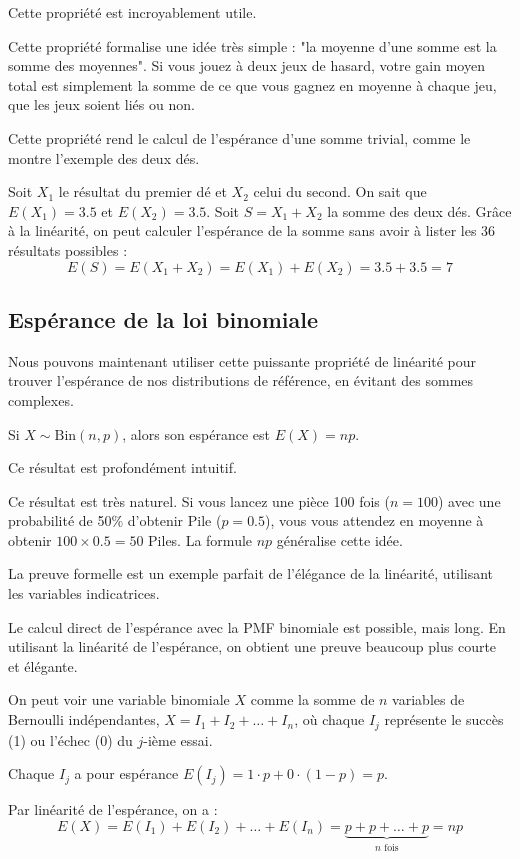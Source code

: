 Cette propriété est incroyablement utile.

\begin{intuitionbox}
Cette propriété formalise une idée très simple : "la moyenne d'une somme est la somme des moyennes". Si vous jouez à deux jeux de hasard, votre gain moyen total est simplement la somme de ce que vous gagnez en moyenne à chaque jeu, que les jeux soient liés ou non.
\end{intuitionbox}

Cette propriété rend le calcul de l'espérance d'une somme trivial, comme le montre l'exemple des deux dés.

\begin{examplebox}
Soit $X_1$ le résultat du premier dé et $X_2$ celui du second. On sait que $E(X_1) = 3.5$ et $E(X_2) = 3.5$.
Soit $S = X_1 + X_2$ la somme des deux dés. Grâce à la linéarité, on peut calculer l'espérance de la somme sans avoir à lister les 36 résultats possibles :
$$ E(S) = E(X_1 + X_2) = E(X_1) + E(X_2) = 3.5 + 3.5 = 7 $$
\end{examplebox}

\subsection{Espérance de la loi binomiale}

Nous pouvons maintenant utiliser cette puissante propriété de linéarité pour trouver l'espérance de nos distributions de référence, en évitant des sommes complexes.

\begin{theorembox}
Si $X \sim \text{Bin}(n, p)$, alors son espérance est $E(X) = np$.
\end{theorembox}

Ce résultat est profondément intuitif.

\begin{intuitionbox}
Ce résultat est très naturel. Si vous lancez une pièce 100 fois ($n=100$) avec une probabilité de 50\% d'obtenir Pile ($p=0.5$), vous vous attendez en moyenne à obtenir $100 \times 0.5 = 50$ Piles. La formule $np$ généralise cette idée.
\end{intuitionbox}

La preuve formelle est un exemple parfait de l'élégance de la linéarité, utilisant les variables indicatrices.

\begin{proofbox}
Le calcul direct de l'espérance avec la PMF binomiale est possible, mais long. En utilisant la linéarité de l'espérance, on obtient une preuve beaucoup plus courte et élégante.

On peut voir une variable binomiale $X$ comme la somme de $n$ variables de Bernoulli indépendantes, $X = I_1 + I_2 + \dots + I_n$, où chaque $I_j$ représente le succès (1) ou l'échec (0) du $j$-ième essai.

Chaque $I_j$ a pour espérance $E(I_j) = 1 \cdot p + 0 \cdot (1-p) = p$.

Par linéarité de l'espérance, on a :
$$ E(X) = E(I_1) + E(I_2) + \dots + E(I_n) = \underbrace{p + p + \dots + p}_{n \text{ fois}} = np $$
\end{proofbox}

